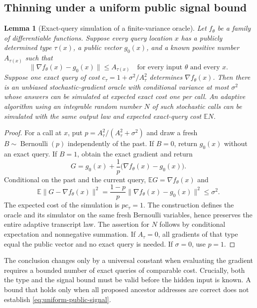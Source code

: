 \documentclass[11pt,a4paper]{article}
\newcommand{\E}{\mathbb E}
\newtheorem{lemma}[theorem]{Lemma}
\theoremstyle{definition}
\theoremstyle{remark}
\begin{document}
\subsection{Thinning under a uniform public signal bound}

\begin{lemma}[Exact-query simulation of a finite-variance oracle]
\label{lem:thinning}
Let $f_\theta$ be a family of differentiable functions.  Suppose every query
location $x$ has a publicly determined type $\tau(x)$, a public vector
$g_0(x)$, and a known positive number $A_{\tau(x)}$ such that
\begin{equation}
 \|\nabla f_\theta(x)-g_0(x)\|\le A_{\tau(x)}
 \quad\text{for every input }\theta\text{ and every }x.
 \label{eq:uniform-public-signal}
\end{equation}
Suppose one exact query of cost
$c_\tau=1+\sigma^2/A_\tau^2$ determines $\nabla f_\theta(x)$.
Then there is an unbiased stochastic-gradient oracle with conditional
variance at most $\sigma^2$ whose answers can be simulated at expected exact
cost one per call.  An adaptive algorithm using an integrable random number
$N$ of such stochastic calls can be simulated with the same output law and
expected exact-query cost $\E N$.
\end{lemma}

\begin{proof}
For a call at $x$, put $p=A_\tau^2/(A_\tau^2+\sigma^2)$ and draw a fresh
$B\sim\operatorname{Bernoulli}(p)$ independently of the past.
If $B=0$, return $g_0(x)$ without an exact query.  If $B=1$, obtain the exact
gradient and return
\[
 G=g_0(x)+\frac1p\bigl(\nabla f_\theta(x)-g_0(x)\bigr).
\]
Conditional on the past and the current query, $\E G=\nabla f_\theta(x)$ and
\[
 \E\|G-\nabla f_\theta(x)\|^2
 =\frac{1-p}{p}\|\nabla f_\theta(x)-g_0(x)\|^2
 \le\sigma^2.
\]
The expected cost of the simulation is $p c_\tau=1$.
The construction defines the oracle and its simulator on the same fresh
Bernoulli variables, hence preserves the entire adaptive transcript law.
The assertion for $N$ follows by conditional expectation and nonnegative
summation.  If $A_\tau=0$, all gradients of that type equal the public vector
and no exact query is needed.  If $\sigma=0$, use $p=1$.
\end{proof}

The conclusion changes only by a universal constant when evaluating the
gradient requires a bounded number of exact queries of comparable cost.
Crucially, both the type and the signal bound must be valid before the hidden
input is known.  A bound that holds only when all proposed ancestor addresses
are correct does not establish \eqref{eq:uniform-public-signal}.
\end{document}
